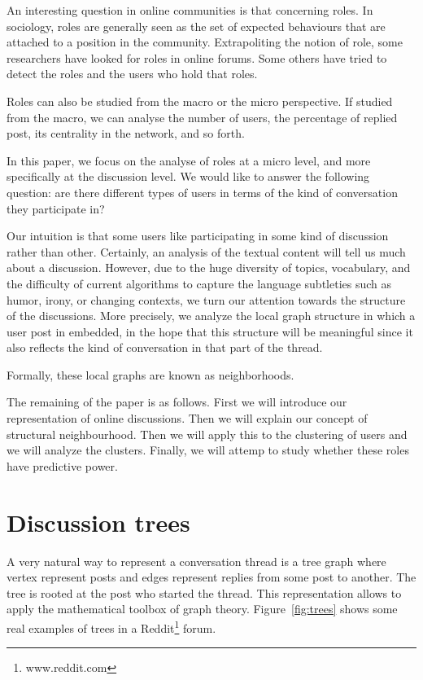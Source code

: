 \documentclass[smallextended]{svjour3}          %
\begin{document}
An interesting question in online communities is that concerning roles. In sociology, roles are generally seen as the set of expected behaviours that are attached  to a position in the community. Extrapoliting the notion of role, some researchers have looked for roles in online forums. Some others have tried to detect the roles and the users who hold that roles.

Roles can also be studied from the macro or the micro perspective. If studied from the macro, we can analyse the number of users, the percentage of replied post, its centrality in the network, and  so forth.

In this paper, we focus on the analyse of roles at a micro level, and more specifically at the discussion level. We would like to answer the following question: are there different types of users in terms of the kind of conversation they participate in?


Our intuition is that some users like participating in some kind of discussion rather than other. Certainly, an analysis of the textual content will tell us much about a discussion. However, due to the huge diversity of topics, vocabulary, and the difficulty of current algorithms to capture the language subtleties such as humor, irony, or changing contexts, we turn our attention towards the structure of the discussions. More precisely, we analyze the local graph structure in which a user post in embedded, in the hope that this structure will be meaningful since it also reflects the kind of conversation in that part of the thread.

Formally, these local graphs are known as neighborhoods.


The remaining of the paper is as follows. First we will introduce our representation of online discussions. Then we will explain our concept of structural neighbourhood. Then we will apply this to the clustering of users and we will analyze the clusters. Finally, we will attemp to study whether these roles have predictive power.


\section{Discussion trees}
A very natural way to represent a conversation thread is a tree graph where vertex represent posts and edges represent replies from some post to another. The tree is rooted at the post who started the thread. This representation allows to apply the mathematical toolbox of graph theory. Figure~\ref{fig:trees} shows some real examples of trees in a Reddit\footnote{www.reddit.com} forum.
\end{document}
